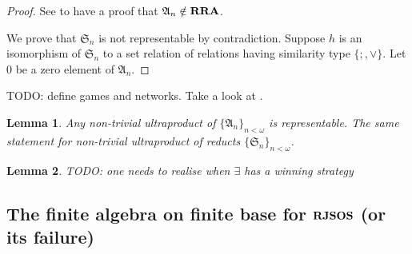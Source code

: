 \documentclass[a4paper]{article}
\theoremstyle{defin}
\theoremstyle{theorem}
\theoremstyle{prop}
\theoremstyle{lemma}
\newtheorem{lemma}{Lemma}
\theoremstyle{ex}
\theoremstyle{col}
\begin{document}
\begin{proof}
  See \cite{hodkinson2000axiomatizability} to have a proof that $\mathfrak{A}_n \notin {\bf RRA}$.

  We prove that $\mathfrak{S}_n$ is not representable by contradiction.
  Suppose $h$ is an isomorphism of $\mathfrak{S}_n$ to a set relation of relations having similarity type $\{ ;, \vee \}$. Let $0$ be a zero element of $\mathfrak{A}_n$.
\end{proof}

TODO: define games and networks. Take a look at \cite{hirsch1997step}.

\begin{lemma}
  Any non-trivial ultraproduct of $\{ \mathfrak{A}_n \}_{n < \omega}$ is representable. The same statement for non-trivial ultraproduct of reducts $\{ \mathfrak{S}_n \}_{n < \omega}$.
\end{lemma}

\begin{lemma}
  TODO: one needs to realise when $\exists$ has a winning strategy
\end{lemma}

\subsection{The finite algebra on finite base for ${\bf RJSOS}$ (or its failure)}



\end{document}
